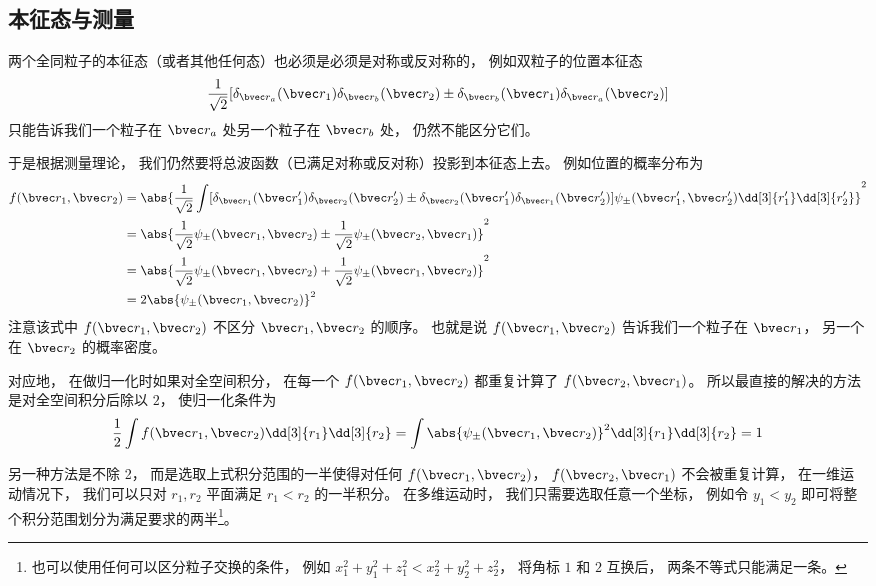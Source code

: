 
\subsection{本征态与测量}
两个全同粒子的本征态（或者其他任何态）也必须是必须是对称或反对称的， 例如双粒子的位置本征态
$$\frac{1}{\sqrt 2}[\delta_{\bvec r_a}(\bvec r_1) \delta_{\bvec r_b}(\bvec r_2)\pm \delta_{\bvec r_b}(\bvec r_1) \delta_{\bvec r_a}(\bvec r_2)]$$
只能告诉我们一个粒子在 $\bvec r_a$ 处另一个粒子在 $\bvec r_b$ 处， 仍然不能区分它们。

于是根据测量理论， 我们仍然要将总波函数（已满足对称或反对称）投影到本征态上去。 例如位置的概率分布为
\begin{equation}\label{eq_ExchOp_1}
\begin{aligned}
f(\bvec r_1, \bvec r_2) &= \abs{\frac{1}{\sqrt{2}}\int [\delta_{\bvec r_1}(\bvec r'_1) \delta_{\bvec r_2}(\bvec r'_2) \pm \delta_{\bvec r_2}(\bvec r'_1) \delta_{\bvec r_1}(\bvec r'_2)] \psi_\pm(\bvec r'_1,\bvec r'_2) \dd[3]{r'_1}\dd[3]{r'_2}}^2\\
&= \abs{\frac{1}{\sqrt{2}} \psi_\pm(\bvec r_1, \bvec r_2) \pm  \frac{1}{\sqrt{2}} \psi_\pm(\bvec r_2, \bvec r_1)}^2\\
&= \abs{\frac{1}{\sqrt{2}} \psi_\pm(\bvec r_1, \bvec r_2) +  \frac{1}{\sqrt{2}} \psi_\pm(\bvec r_1, \bvec r_2)}^2\\
&= 2\abs{\psi_\pm(\bvec r_1, \bvec r_2)}^2
\end{aligned}
\end{equation}
注意该式中 $f(\bvec r_1, \bvec r_2)$ 不区分 $\bvec r_1, \bvec r_2$ 的顺序。 也就是说 $f(\bvec r_1, \bvec r_2)$ 告诉我们一个粒子在 $\bvec r_1$， 另一个在 $\bvec r_2$ 的概率密度。

对应地， 在做归一化时如果对全空间积分， 在每一个 $f(\bvec r_1, \bvec r_2)$ 都重复计算了 $f(\bvec r_2, \bvec r_1)$。 所以最直接的解决的方法是对全空间积分后除以 $2$， 使归一化条件为
\begin{equation}\label{eq_ExchOp_2}
\frac{1}{2}\int f(\bvec r_1, \bvec r_2) \dd[3]{r_1}\dd[3]{r_2} = \int \abs{\psi_\pm(\bvec r_1, \bvec r_2)}^2 \dd[3]{r_1}\dd[3]{r_2} = 1
\end{equation}

另一种方法是不除 2， 而是选取上式积分范围的一半使得对任何 $f(\bvec r_1, \bvec r_2)$， $f(\bvec r_2, \bvec r_1)$ 不会被重复计算， 在一维运动情况下， 我们可以只对 $r_1, r_2$ 平面满足 $r_1 < r_2$ 的一半积分。 在多维运动时， 我们只需要选取任意一个坐标， 例如令 $y_1 < y_2$ 即可将整个积分范围划分为满足要求的两半\footnote{也可以使用任何可以区分粒子交换的条件， 例如 $x_1^2 + y_1^2 + z_1^2 < x_2^2 + y_2^2 + z_2^2$， 将角标 $1$ 和 $2$ 互换后， 两条不等式只能满足一条。}。

